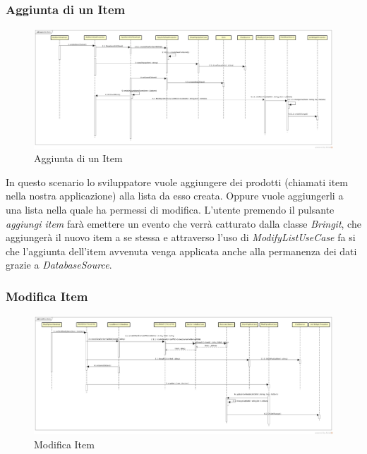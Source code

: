 \subsubsection{Aggiunta di un Item}

\label{Aggiunta di un Item}
\begin{figure}[H]
	\centering
	\includegraphics[width=\textwidth]{Sezioni/Diagrammi/App/aggiunta_item.jpg}
	\caption{Aggiunta di un Item}
\end{figure}

In questo scenario lo sviluppatore vuole aggiungere dei prodotti (chiamati item nella nostra applicazione) alla lista da esso creata. Oppure vuole aggiungerli a una lista nella quale ha permessi di modifica. L'utente premendo il pulsante \textit{aggiungi item} farà emettere un evento che verrà catturato dalla classe \textit{Bringit}, che aggiungerà il nuovo item a se stessa e attraverso l'uso di \textit{ModifyListUseCase} fa si che l'aggiunta dell'item avvenuta venga applicata anche alla permanenza dei dati grazie a \textit{DatabaseSource}.


\subsubsection{Modifica Item}

\label{Modifica Item}
\begin{figure}[H]
	\centering
	\includegraphics[width=\textwidth]{Sezioni/Diagrammi/App/modifica_item.jpg}
	\caption{Modifica Item}
\end{figure}

